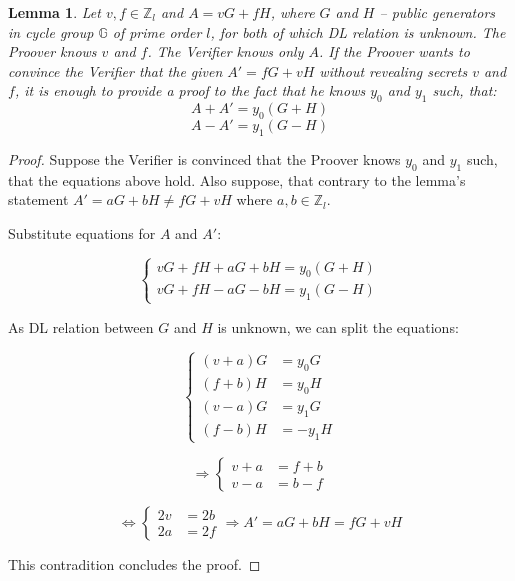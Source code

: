 \documentclass{article}
\numberwithin{figure}{section}
\begin{document}
\newtheorem{theorem}{Theorem}%
\newtheorem{corollary}{Corollary}[theorem]
\newtheorem{lemma}[theorem]{Lemma}


\begin{lemma} \label{l_AA'}
Let $v, f \in \mathbb{Z}_l$ and $A = vG + fH$, where $G$ and $H$ -- public generators in cycle group $\mathbb{G}$ of prime order $l$, for both of which DL relation is unknown. The Proover knows $v$ and $f$. The Verifier knows only $A$. If the Proover wants to convince the Verifier that the given $A' = fG + vH$ without revealing secrets $v$ and $f$, it is enough to provide a proof to the fact that he knows $y_0$ and $y_1$ such, that:
\[ A + A' = y_0 (G+H) \]
\[ A - A' = y_1 (G-H) \]
\end{lemma}

\begin{proof}
Suppose the Verifier is convinced that the Proover knows $y_0$ and $y_1$ such, that the equations above hold. Also suppose, that contrary to the lemma's statement $A' = aG + bH \neq fG + vH$ where $a, b \in \mathbb{Z}_l$.

Substitute equations for $A$ and $A'$:

\begin{equation*}
    \left\{ \begin{aligned} 
        vG + fH + aG + bH = y_0 (G+H) \\
        vG + fH - aG - bH = y_1 (G-H)
    \end{aligned} \right.
\end{equation*}

As DL relation between $G$ and $H$ is unknown, we can split the equations:

\begin{equation*}
    \left\{ \begin{aligned} 
        (v + a) G &= y_0 G \\
        (f + b) H &= y_0 H \\
        (v - a) G &= y_1 G \\
        (f - b) H &= -y_1 H
    \end{aligned} \right.
\end{equation*}

\begin{equation*}
    \Rightarrow
    \left\{ \begin{aligned} 
        v + a &= f + b \\
        v - a &= b - f
    \end{aligned} \right.
\end{equation*}

\begin{equation*}
    \Leftrightarrow
    \left\{ \begin{aligned} 
        2v &= 2b \\
        2a &= 2f
    \end{aligned} \right.
    \Rightarrow A' = aG + bH = fG + vH 
\end{equation*}

This contradition concludes the proof.

\end{proof}
\end{document}
